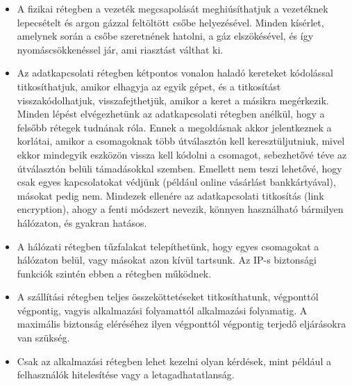 \documentclass[12pt]{article}
\theoremstyle{plain}
\begin{document}
\begin{itemize}
    \item A fizikai rétegben a vezeték megcsapolását meghiúsíthatjuk a vezetéknek lepecsételt és argon gázzal feltöltött csőbe helyezésével. Minden kísérlet, amelynek során a csőbe szeretnének hatolni, a gáz elszökésével, és így nyomáscsökkenéssel jár, ami riasztást válthat ki.
    \item Az adatkapcsolati rétegben kétpontos vonalon haladó kereteket kódolással titkosíthatjuk, amikor elhagyja az egyik gépet, és a titkosítást visszakódolhatjuk, visszafejthetjük, amikor a keret a másikra megérkezik. Minden lépést elvégezhetünk az adatkapcsolati rétegben anélkül, hogy a felsőbb rétegek tudnának róla. Ennek a megoldásnak akkor jelentkeznek a korlátai, amikor a csomagoknak több útválasztón kell keresztüljutniuk, mivel ekkor mindegyik eszközön vissza kell kódolni a csomagot, sebezhetővé téve az útválasztón belüli támadásokkal szemben. Emellett nem teszi lehetővé, hogy csak egyes kapcsolatokat védjünk (például online vásárlást bankkártyával), másokat pedig nem. Mindezek ellenére az adatkapcsolati titkosítás (link encryption), ahogy a fenti módszert nevezik, könnyen használható bármilyen hálózaton, és gyakran hatásos.
    \item A hálózati rétegben tűzfalakat telepíthetünk, hogy egyes csomagokat a hálózaton belül, vagy másokat azon kívül tartsunk. Az IP-s biztonsági funkciók szintén ebben a rétegben működnek.
    \item A szállítási rétegben teljes összeköttetéseket titkosíthatunk, végponttól végpontig, vagyis alkalmazási folyamattól alkalmazási folyamatig. A maximális biztonság eléréséhez ilyen végponttól végpontig terjedő eljárásokra van szükség.
    \item Csak az alkalmazási rétegben lehet kezelni olyan kérdések, mint például a felhasználók hitelesítése vagy a letagadhatatlanság.
\end{itemize}{}









\end{document}
